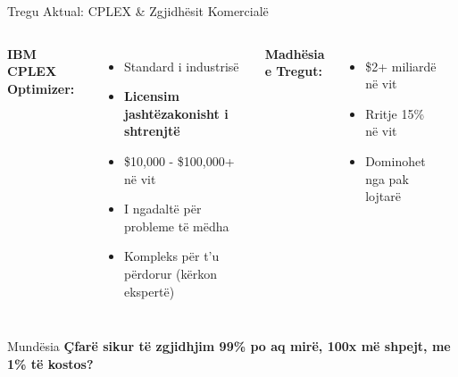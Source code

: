 \documentclass[aspectratio=169]{beamer}
\begin{document}
\begin{frame}{Tregu Aktual: CPLEX \& Zgjidhësit Komercialë}
\begin{columns}
\textbf{IBM CPLEX Optimizer:}
\begin{itemize}
    \item Standard i industrisë
    \item \textcolor{aired}{\textbf{Licensim jashtëzakonisht i shtrenjtë}}
    \item \$10,000 - \$100,000+ në vit
    \item I ngadaltë për probleme të mëdha
    \item Kompleks për t'u përdorur (kërkon ekspertë)
\end{itemize}

\vspace{0.3cm}
\textbf{Madhësia e Tregut:}
\begin{itemize}
    \item \$2+ miliardë në vit
    \item Rritje 15\% në vit
    \item Dominohet nga pak lojtarë
\end{itemize}

\begin{center}
\end{center}
\end{columns}

\begin{block}{Mundësia}
\textbf{Çfarë sikur të zgjidhjim 99\% po aq mirë, 100x më shpejt, me 1\% të kostos?}
\end{block}
\end{frame}
\end{document}
